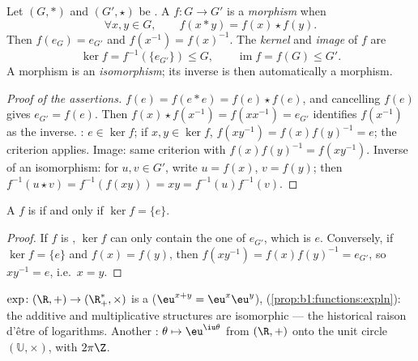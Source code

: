 \begin{definition}\label{def:b1:structures:morphism}
Let $(G, *)$ and $(G', \star)$ be . A  $f \colon G \to G'$
is a \emph{morphism} when
\[
\forall x, y \in G, \qquad f(x * y) = f(x) \star f(y).
\]
Then $f(e_G) = e_{G'}$ and $f(x^{-1}) = f(x)^{-1}$. The
\emph{kernel} and \emph{image} of $f$ are
\[
\ker f = f^{-1}(\{e_{G'}\}) \leq G,
\qquad
\operatorname{im} f = f(G) \leq G' .
\]
A  morphism is an \emph{isomorphism}; its inverse  is then
automatically a morphism.
\end{definition}

\begin{proof}[Proof of the assertions]
$f(e) = f(e * e) = f(e)\star f(e)$, and cancelling $f(e)$ gives
$e_{G'} = f(e)$. Then $f(x)\star f(x^{-1}) = f(x x^{-1}) = e_{G'}$
identifies $f(x^{-1})$ as the inverse. : $e \in \ker f$; if
$x, y \in \ker f$, $f(xy^{-1}) = f(x)f(y)^{-1} = e$; the criterion
applies. Image: same criterion with $f(x)f(y)^{-1} = f(xy^{-1})$.
Inverse of an isomorphism: for $u, v \in G'$, write $u = f(x)$, $v =
f(y)$; then $f^{-1}(u \star v) = f^{-1}(f(xy)) = xy =
f^{-1}(u) f^{-1}(v)$.
\end{proof}

\begin{proposition}\label{prop:b1:structures:kernel}
A   $f$ is  if and only if $\ker f =
\{e\}$.
\end{proposition}

\begin{proof}
If $f$ is , $\ker f$ can only contain the one  of
$e_{G'}$, which is $e$. Conversely, if $\ker f = \{e\}$ and $f(x) =
f(y)$, then $f(xy^{-1}) = f(x) f(y)^{-1} = e_{G'}$, so $xy^{-1} = e$,
i.e.\ $x = y$.
\end{proof}

\begin{example}\label{ex:b1:structures:expmorphism}
$\exp \colon (\R, +) \to (\R_+^*, \times)$ is a 
($\eu^{x+y} = \eu^x \eu^y$), 
(\cref{prop:b1:functions:expln}): the additive and multiplicative
structures are isomorphic --- the historical raison d'être of
logarithms. Another : $\theta \mapsto \eu^{\iu\theta}$ from
$(\R, +)$ onto the unit circle $(\mathbb{U}, \times)$, with 
$2\pi\Z$.
\end{example}

